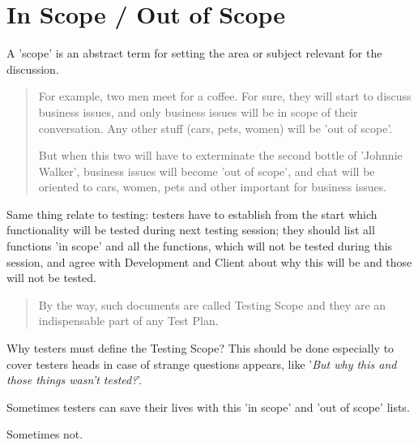 \section{In Scope / Out of Scope}
\label{sec:In Scope / Out of Scope}

A 'scope' is an abstract term for setting the area or subject relevant for the discussion.

\begin{quote}
For example, two men meet for a coffee. For sure, they will start to discuss business issues, and only business issues will be in scope of their conversation. Any other stuff (cars, pets, women) will be 'out of scope'.

But when this two will have to exterminate the second bottle of 'Johnnie Walker', business issues will become 'out of scope', and chat will be oriented to cars, women, pets and other important for business issues.                                                                                                                                                                                                                     \end{quote} 

Same thing relate to testing: testers have to establish from the start which functionality will be tested during next testing session; they should list all functions 'in scope' and all the functions, which will not be tested during this session, and agree with Development and Client about why this will be and those will not be tested.

\begin{quote}
By the way, such documents are called Testing Scope and they are an indispensable part of any Test Plan.\end{quote} 

Why testers must define the Testing Scope? This should be done especially to cover testers heads in case of strange questions appears, like '\textit{But why this and those things wasn't tested?}'. 

Sometimes testers can save their lives with this 'in scope' and 'out of scope' lists.

Sometimes not.